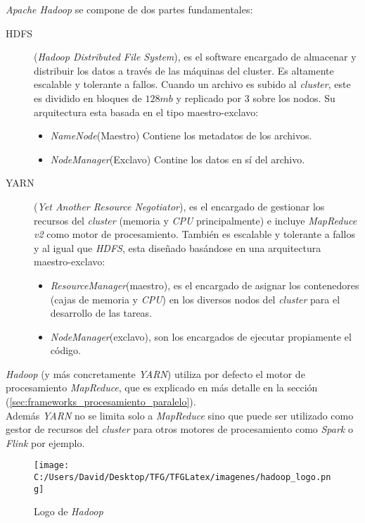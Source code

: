 \noindent \textit{Apache Hadoop} se compone de dos partes fundamentales:
\begin{description}
  \item[HDFS](\textit{Hadoop Distributed File System}), es el software encargado de almacenar 
  y distribuir los datos a través de las máquinas del cluster. Es altamente escalable y tolerante a fallos.
  Cuando un archivo es subido al \textit{cluster}, este es dividido en bloques de $128 mb$ y replicado por
  3 sobre los nodos.
  Su arquitectura esta basada en el tipo maestro-exclavo:
  \begin{itemize}
    \item \textit{NameNode}(Maestro) Contiene los metadatos de los archivos.
    \item \textit{NodeManager}(Exclavo) Contine los datos en sí del archivo.
  \end{itemize}

  \item[YARN] (\textit{Yet Another Resource Negotiator}), es el encargado de gestionar 
  los recursos del \textit{cluster} (memoria y \textit{CPU} principalmente) e incluye \textit{MapReduce v2} 
  como motor de procesamiento. También es escalable y tolerante a fallos y al igual que \textit{HDFS}, 
  esta diseñado basándose en una arquitectura maestro-exclavo:
  \begin{itemize}
    \item \textit{ResourceManager}(maestro), es el encargado de asignar los contenedores (cajas de
    memoria y \textit{CPU}) en los diversos nodos del \textit{cluster} para el desarrollo de las tareas.
    \item \textit{NodeManager}(exclavo), son los encargados de ejecutar propiamente el código.
  \end{itemize}
\end{description}

\noindent \textit{Hadoop} (y más concretamente \textit{YARN}) utiliza por defecto el motor de procesamiento \textit{MapReduce},
que es explicado en más detalle en la sección  
  (\autoref{sec:frameworks_procesamiento_paralelo}). \\
Además \textit{YARN} no se limita solo a \textit{MapReduce} sino que puede ser utilizado como gestor de recursos
del \textit{cluster} para otros motores de procesamiento como \textit{Spark} o \textit{Flink} por ejemplo.

\begin{figure}[!htpb]
  \centering
  \texttt{[image: C:/Users/David/Desktop/TFG/TFGLatex/imagenes/hadoop\_logo.png]}
  \caption[Logo de \textit{Hadoop}]{Logo de \textit{Hadoop}}
  \label{hadoop_logo}
\end{figure}


